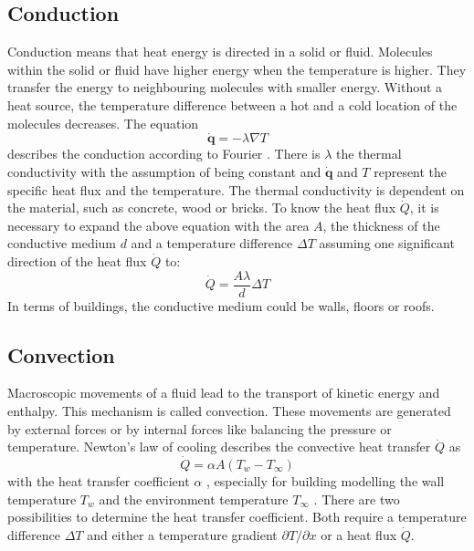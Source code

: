 \subsection{Conduction}
\label{subsection:conduction}

    Conduction means that heat energy is directed in a solid or fluid. Molecules within the solid or fluid have higher energy when the temperature is higher. They transfer the energy to neighbouring molecules with smaller energy. Without a heat source, the temperature difference between a hot and a cold location of the molecules decreases.\cite{Kuchling.2007}
    \newline The equation
    \begin{equation}
    \label{eq:fourier}
        \dot{\textbf{q}} = - \lambda \nabla T
    \end{equation}
    describes the conduction according to Fourier \cite{.2013}. There is $\lambda$  the thermal conductivity with the assumption of being constant and $\dot{\textbf{q}}$ and $T$ represent the specific heat flux and the temperature. The thermal conductivity is dependent on the material, such as concrete, wood or bricks. 
    \newline
    To know the heat flux $\dot{Q}$, it is necessary to expand the above equation with the area $A$, the thickness of the conductive medium $d$ and a temperature difference $\Delta T$  assuming one significant direction of the heat flux $\dot{Q}$ to:
    \begin{equation}
    \label{eq:conduction1}
        \dot{Q} = \frac{A\lambda}{d} \Delta T
    \end{equation}
    In terms of buildings, the conductive medium could be walls, floors or roofs.

\subsection{Convection}
\label{subsection:convection}

    Macroscopic movements of a fluid lead to the transport of kinetic energy and enthalpy. This mechanism is called convection. These movements are generated by external forces or by internal forces like balancing the pressure or temperature.\cite{.2013}
    \newline
    Newton's law of cooling describes the convective heat transfer $\dot{Q}$ as 
    \begin{equation}
    \label{eq:newton}
        \dot{Q} = \alpha A (T_w - T_\infty)
    \end{equation}
    with the heat transfer coefficient $\alpha$ , especially for building modelling the wall temperature $T_w$ and the environment temperature $T_\infty$ \cite{Griesinger.2019}
    . There are two possibilities to determine the heat transfer coefficient. Both require a temperature difference $\Delta T$ and either a temperature gradient $\partial T/\partial x$  or a heat flux $\dot{Q}$.
    \cite{.2013} 

